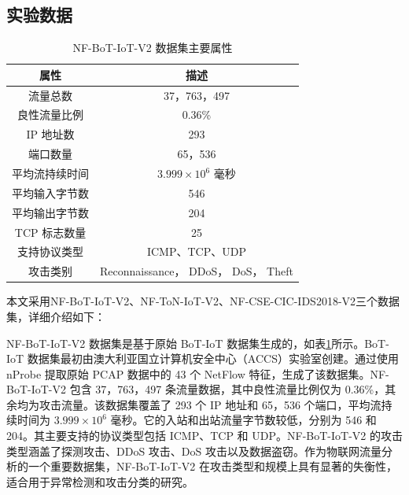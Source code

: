 \documentclass[promaster]{thesis-uestc}
\begin{document}
\subsection{实验数据}

\begin{table}[h!]
    \centering
    \caption{NF-BoT-IoT-V2 数据集主要属性}
    \begin{tabular}{c||c} \hline\hline
        \textbf{属性} & \textbf{描述} \\ \hline
        流量总数 & 37，763，497 \\ \hline
        良性流量比例 & 0.36\% \\ \hline
        IP 地址数 & 293 \\ \hline
        端口数量 & 65，536 \\ \hline
        平均流持续时间 & $3.999 \times 10^6$ 毫秒 \\ \hline
        平均输入字节数 & 546 \\ \hline
        平均输出字节数 & 204 \\ \hline
        TCP 标志数量 & 25 \\ \hline
        支持协议类型 & ICMP、TCP、UDP \\ \hline
        攻击类别 & Reconnaissance， DDoS， DoS， Theft  \\ \hline\hline
    \end{tabular}
    \label{tbl:nf_bot_iot_v2}
\end{table}
本文采用NF-BoT-IoT-V2、NF-ToN-IoT-V2、NF-CSE-CIC-IDS2018-V2三个数据集，详细介绍如下：

NF-BoT-IoT-V2 数据集是基于原始 BoT-IoT 数据集生成的，如表\ref{tbl:nf_bot_iot_v2}所示。BoT-IoT 数据集最初由澳大利亚国立计算机安全中心（ACCS）实验室创建。通过使用 nProbe 提取原始 PCAP 数据中的 43 个 NetFlow 特征，生成了该数据集。NF-BoT-IoT-V2 包含 37，763，497 条流量数据，其中良性流量比例仅为 0.36\%，其余均为攻击流量。该数据集覆盖了 293 个 IP 地址和 65，536 个端口，平均流持续时间为 $3.999 \times 10^6$ 毫秒。它的入站和出站流量字节数较低，分别为 546 和 204。其主要支持的协议类型包括 ICMP、TCP 和 UDP。NF-BoT-IoT-V2 的攻击类型涵盖了探测攻击、DDoS 攻击、DoS 攻击以及数据盗窃。作为物联网流量分析的一个重要数据集，NF-BoT-IoT-V2 在攻击类型和规模上具有显著的失衡性，适合用于异常检测和攻击分类的研究。
\end{document}

